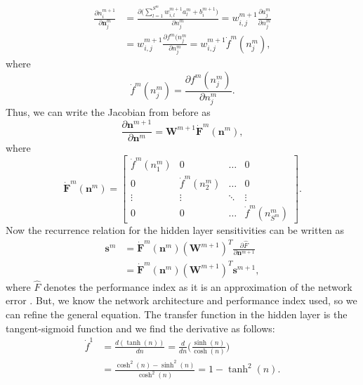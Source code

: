 \documentclass[12pt,halfline,a4paper]{ouparticle}
\begin{document}
\begin{equation}
\begin{split}
\frac{\partial n^{m+1}_{i}}{\partial \mathbf{n}^{m}_{j}} &= \frac{\partial \bigg(\sum_{l=1}^{S^{m}} w_{i, l}^{m+1}a_{l}^{m} + b_{i}^{m+1}\bigg)}{\partial n_{j}^{m}} = w_{i, j}^{m+1} \frac{\partial a_{j}^{m}}{\partial n_{j}^{m}} \\
&= w_{i, j}^{m+1} \frac{\partial f^{m}(n_{j}^{m}}{\partial n_{j}^{m}} = w_{i, j}^{m+1} \dot{f}^{m}(n_{j}^{m}) ,  
\end{split}
\end{equation}
where 
\begin{equation}
\dot{f}^{m}(n_{j}^{m}) = \frac{\partial f^{m}(n_{j}^{m})}{\partial n_{j}^{m}}.
\end{equation}
Thus, we can write the Jacobian from before as 
\begin{equation}
\frac{\partial \mathbf{n}^{m+1}}{\partial \mathbf{n}^{m}} = \mathbf{W}^{m+1} \dot{\mathbf{F}}^{m}(\mathbf{n}^{m}), 
\end{equation}
where 
\begin{equation}
\dot{\mathbf{F}}^{m}(\mathbf{n}^{m}) = \begin{bmatrix} \dot{f}^{m}(n_{1}^{m}) & 0 & \ldots & 0 \\ 
0 & \dot{f}^{m}(n_{2}^{m}) & \ldots & 0 \\
\vdots & \vdots & \ddots & \vdots \\ 
0 & 0 & \ldots & \dot{f}^{m}(n_{S^{m}}^{m}) \end{bmatrix}.
\end{equation}
Now the recurrence relation for the hidden layer sensitivities can be written as 
\begin{equation}
\begin{split}
\mathbf{s}^{m} & = \dot{\mathbf{F}}^{m}(\mathbf{n}^{m})(\mathbf{W}^{m+1})^{T}\frac{\partial \hat{F}}{\partial \mathbf{n}^{m+1}} \\
& = \dot{\mathbf{F}}^{m}(\mathbf{n}^{m})(\mathbf{W}^{m+1})^{T}\mathbf{s}^{m+1},
\end{split}
\end{equation}
where $\hat{F}$ denotes the performance index as it is an approximation of the network error \cite{hagan2014}. But, we know the network architecture and performance index used, so we can refine the general equation. The transfer function in the hidden layer is the tangent-sigmoid function and we find the derivative as follows: 
\begin{equation}
\begin{split}
\dot{f}^{1} & = \frac{d(\tanh(n))}{dn} = \frac{d}{dn}\bigg(\frac{\sinh(n)}{\cosh(n)}\bigg) \\
 & = \frac{\cosh^{2}(n) - \sinh^{2}(n)}{\cosh^{2}(n)} = 1 - \tanh^{2}(n). 
\end{split}
\end{equation}
\end{document}
